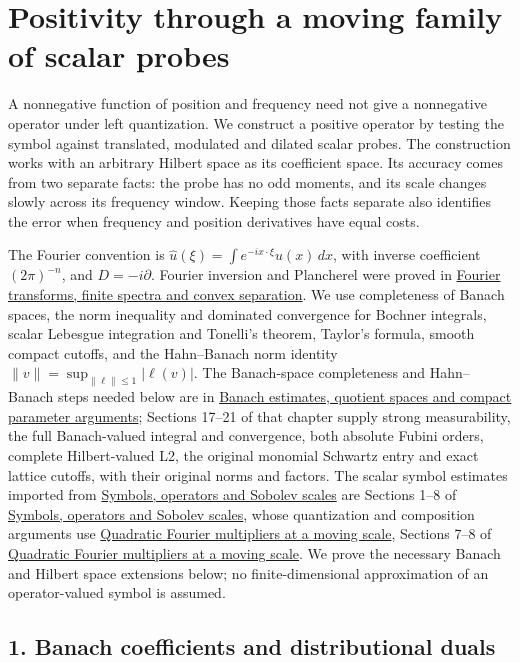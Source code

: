 \documentclass[
  11pt,
]{article}
\author{}
\date{}
\begin{document}
\section{Positivity through a moving family of scalar
probes}\label{positivity-through-a-moving-family-of-scalar-probes}

A nonnegative function of position and frequency need not give a
nonnegative operator under left quantization. We construct a positive
operator by testing the symbol against translated, modulated and dilated
scalar probes. The construction works with an arbitrary Hilbert space as
its coefficient space. Its accuracy comes from two separate facts: the
probe has no odd moments, and its scale changes slowly across its
frequency window. Keeping those facts separate also identifies the error
when frequency and position derivatives have equal costs.

The Fourier convention is
\(\widehat u(\xi)=\int e^{-ix\cdot\xi}u(x)\,dx\), with inverse
coefficient \((2\pi)^{-n}\), and \(D=-i\partial\). Fourier inversion and
Plancherel were proved in \href{prerequisite-bridges.pdf}{Fourier
transforms, finite spectra and convex separation}. We use completeness
of Banach spaces, the norm inequality and dominated convergence for
Bochner integrals, scalar Lebesgue integration and Tonelli's theorem,
Taylor's formula, smooth compact cutoffs, and the Hahn--Banach norm
identity \(\|v\|=\sup_{\|\ell\|\leq1}|\ell(v)|\). The Banach-space
completeness and Hahn--Banach steps needed below are in
\href{banach-foundation-bridges.pdf}{Banach estimates, quotient spaces
and compact parameter arguments}; Sections 17--21 of that chapter supply
strong measurability, the full Banach-valued integral and convergence,
both absolute Fubini orders, complete Hilbert-valued L2, the original
monomial Schwartz entry and exact lattice cutoffs, with their original
norms and factors. The scalar symbol estimates imported from
\href{euclidean-symbol-calculus.pdf}{Symbols, operators and Sobolev
scales} are Sections 1--8 of
\href{euclidean-symbol-calculus.pdf}{Symbols, operators and Sobolev
scales}, whose quantization and composition arguments use
\href{gauss-transform-estimates.pdf}{Quadratic Fourier multipliers at a
moving scale}, Sections 7--8 of
\href{gauss-transform-estimates.pdf}{Quadratic Fourier multipliers at a
moving scale}. We prove the necessary Banach and Hilbert space
extensions below; no finite-dimensional approximation of an
operator-valued symbol is assumed.

\subsection{1. Banach coefficients and distributional
duals}\label{banach-coefficients-and-distributional-duals}
\end{document}
